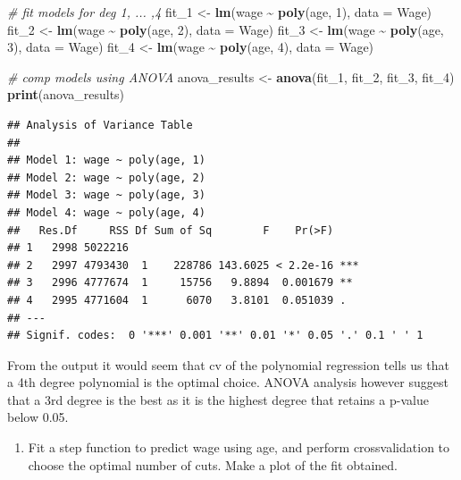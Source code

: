\documentclass[
]{article}
\newenvironment{Shaded}{\begin{snugshade}}{\end{snugshade}}
\newcommand{\AttributeTok}[1]{\textcolor[rgb]{0.13,0.29,0.53}{#1}}
\newcommand{\CommentTok}[1]{\textcolor[rgb]{0.56,0.35,0.01}{\textit{#1}}}
\newcommand{\DecValTok}[1]{\textcolor[rgb]{0.00,0.00,0.81}{#1}}
\newcommand{\FunctionTok}[1]{\textcolor[rgb]{0.13,0.29,0.53}{\textbf{#1}}}
\newcommand{\NormalTok}[1]{#1}
\newcommand{\OtherTok}[1]{\textcolor[rgb]{0.56,0.35,0.01}{#1}}
\newcommand{\SpecialCharTok}[1]{\textcolor[rgb]{0.81,0.36,0.00}{\textbf{#1}}}
\providecommand{\tightlist}{%
  \setlength{\itemsep}{0pt}\setlength{\parskip}{0pt}}
\begin{document}
\begin{Shaded}
\begin{Highlighting}[]
\CommentTok{\# fit models for deg 1, ... ,4}
\NormalTok{fit\_1 }\OtherTok{\textless{}{-}} \FunctionTok{lm}\NormalTok{(wage }\SpecialCharTok{\textasciitilde{}} \FunctionTok{poly}\NormalTok{(age, }\DecValTok{1}\NormalTok{), }\AttributeTok{data =}\NormalTok{ Wage)  }
\NormalTok{fit\_2 }\OtherTok{\textless{}{-}} \FunctionTok{lm}\NormalTok{(wage }\SpecialCharTok{\textasciitilde{}} \FunctionTok{poly}\NormalTok{(age, }\DecValTok{2}\NormalTok{), }\AttributeTok{data =}\NormalTok{ Wage)  }
\NormalTok{fit\_3 }\OtherTok{\textless{}{-}} \FunctionTok{lm}\NormalTok{(wage }\SpecialCharTok{\textasciitilde{}} \FunctionTok{poly}\NormalTok{(age, }\DecValTok{3}\NormalTok{), }\AttributeTok{data =}\NormalTok{ Wage)  }
\NormalTok{fit\_4 }\OtherTok{\textless{}{-}} \FunctionTok{lm}\NormalTok{(wage }\SpecialCharTok{\textasciitilde{}} \FunctionTok{poly}\NormalTok{(age, }\DecValTok{4}\NormalTok{), }\AttributeTok{data =}\NormalTok{ Wage)  }

\CommentTok{\# comp models using ANOVA}
\NormalTok{anova\_results }\OtherTok{\textless{}{-}} \FunctionTok{anova}\NormalTok{(fit\_1, fit\_2, fit\_3, fit\_4)}
\FunctionTok{print}\NormalTok{(anova\_results)}
\end{Highlighting}
\end{Shaded}

\begin{verbatim}
## Analysis of Variance Table
## 
## Model 1: wage ~ poly(age, 1)
## Model 2: wage ~ poly(age, 2)
## Model 3: wage ~ poly(age, 3)
## Model 4: wage ~ poly(age, 4)
##   Res.Df     RSS Df Sum of Sq        F    Pr(>F)    
## 1   2998 5022216                                    
## 2   2997 4793430  1    228786 143.6025 < 2.2e-16 ***
## 3   2996 4777674  1     15756   9.8894  0.001679 ** 
## 4   2995 4771604  1      6070   3.8101  0.051039 .  
## ---
## Signif. codes:  0 '***' 0.001 '**' 0.01 '*' 0.05 '.' 0.1 ' ' 1
\end{verbatim}

From the output it would seem that cv of the polynomial regression tells
us that a 4th degree polynomial is the optimal choice. ANOVA analysis
however suggest that a 3rd degree is the best as it is the highest
degree that retains a p-value below 0.05.

\begin{enumerate}
\def\labelenumi{(\alph{enumi})}
\setcounter{enumi}{1}
\tightlist
\item
  Fit a step function to predict wage using age, and perform
  crossvalidation to choose the optimal number of cuts. Make a plot of
  the fit obtained.
\end{enumerate}
\end{document}
